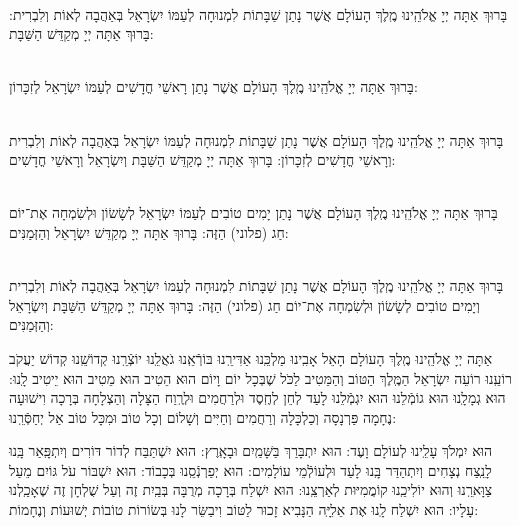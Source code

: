 \documentclass[twoside, openany, parskip=half, 11pt]{book}
\begin{document}
\begin{sometimes}

\\
בָּרוּךְ אַתָּה יְיָ אֱלֹהֵֽינוּ מֶֽלֶךְ הָעוֹלָם אֲשֶׁר נָתַן שַׁבָּתוֹת לִמְנוּחָה לְעַמּוֹ יִשְׂרָאֵל בְּאַהֲבָה 
לְאוֹת וְלִבְרִית: בָּרוּךְ אַתָּה יְיָ מְקַדֵּשׁ הַשַּׁבָּת:


\\
בָּרוּךְ אַתָּה יְיָ אֱלֹהֵֽינוּ מֶֽלֶךְ הָעוֹלָם 
אֲשֶׁר נָתַן רָאשֵׁי חֳדָשִׁים לְעַמּוֹ יִשְׂרָאֵל לְזִכָּרוֹן:


\\
בָּרוּךְ אַתָּה יְיָ אֱלֹהֵֽינוּ מֶֽלֶךְ הָעוֹלָם 
אֲשֶׁר נָתַן שַׁבָּתוֹת לִמְנוּחָה לְעַמּוֹ יִשְׂרָאֵל בְּאַהֲבָה לְאוֹת וְלִבְרִית וְרָאשֵׁי חֳדָשִׁים לְזִכָּרוֹן: 
בָּרוּךְ אַתָּה יְיָ מְקַדֵּשׁ הַשַּׁבָּת וְיִשְׂרָאֵל וְרָאשֵׁי חֳדָשִׁים:

\\
בָּרוּךְ אַתָּה יְיָ אֱלֹהֵֽינוּ מֶֽלֶךְ הָעוֹלָם 
אֲשֶׁר נָתַן יָמִים טוֹבִים לְעַמּוֹ יִשְׂרָאֵל 
לְשָׂשׂוֹן וּלְשִׂמְחָה אֶת־יוֹם חַג (פלוני) הַזֶּה: 
בָּרוּךְ אַתָּה יְיָ מְקַדֵּשׁ יִשְׂרָאֵל וְהַזְּמַנִּים:

\\
בָּרוּךְ אַתָּה יְיָ אֱלֹהֵֽינוּ מֶֽלֶךְ הָעוֹלָם אֲשֶׁר נָתַן שַׁבָּתוֹת לִמְנוּחָה לְעַמּוֹ יִשְׂרָאֵל בְּאַהֲבָה לְאוֹת וְלִבְרִית 
וְיָמִים טוֹבִים לְשָׂשׂוֹן וּלְשִׂמְחָה אֶת־יוֹם חַג (פלוני) הַזֶּה: 
בָּרוּךְ אַתָּה יְיָ מְקַדֵּשׁ הַשַּׁבָּת וְיִשְׂרָאֵל וְהַזְּמַנִּים:

\end{sometimes}


 אַתָּה יְיָ אֱלֹהֵֽינוּ מֶֽלֶךְ הָעוֹלָם הָאֵל אָבִֽינוּ מַלְכֵּֽנוּ אַדִּירֵֽנוּ בּוֹרְֿאֵֽנוּ גֹאֲלֵֽנוּ יוֹצְֿרֵֽנוּ קְדוֹשֵֽׁנוּ קְדוֹשׁ יַעֲקֹב רוֹעֵֽנוּ רוֹעֵה יִשְׂרָאֵל הַמֶּֽלֶךְ הַטּוֹב וְהַמֵּטִיב לַכֹּל שֶׁבְּכָל יוֹם וָיוֹם הוּא הֵטִיב הוּא מֵטִיב הוּא יֵיטִיב לָֽנוּ: הוּא גְמָלָֽנוּ הוּא גוֹמְֿלֵנוּ הוּא יִגְמְֿלֵנוּ לָעַד לְחֵן לְחֶֽסֶד וּלְרַחֲמִים וּלְרֶֽוַח הַצָּלָה וְהַצְלָחָה בְּרָכָה וִישׁוּעָה נֶחָמָה פַּרְנָסָה וְכַלְכָּלָה וְרַחֲמִים וְחַיִּים וְשָׁלוֹם וְכָל טוֹב וּמִכָּל טוֹב אַל יְחַסְּֿרֵֽנוּ: 



 הוּא יִמְלֹךְ עָלֵֽינוּ לְעוֹלָם וָעֶד: 
	 הוּא יִתְבָּרַךְ בַּשָּׁמַֽיִם וּבָאָֽרֶץ: 
	 הוּא יִשְׁתַּבַּח לְדוֹר דּוֹרִים וְיִתְפָּֽאַר בָּֽנוּ לָנֵֽצַח נְצָחִים 
		 וְיִתְהַדַּר בָּֽנוּ לָעַד וּלְעוֹלְֿמֵי עוֹלָמִים: 
	 הוּא יְפַרְנְֿסֵֽנוּ בְּכָבוֹד: 
	 הוּא יִשְׁבּוֹר עֹל גּוֹיִם מֵעַל צַוָּארֵֽנוּ וְהוּא יוֹלִיכֵֽנוּ קוֹמֲמִיּוּת לְאַרְצֵֽנוּ: 
	 הוּא יִשְׁלַח בְּרָכָה מְרֻבָּה בְּבַֽיִת זֶה וְעַל שֻׁלְחָן זֶה שֶׁאָכַֽלְנוּ עָלָיו: 
 הוּא יִשְׁלַח לָֽנוּ אֶת אֵלִיָּֽה הַנָּבִיא זָכוּר לַטּוֹב וִיבַשֵּׂר לָנוּ בְּשׂוֹרוֹת טוֹבוֹת יְשׁוּעוֹת וְנֶחָמוֹת:
\end{document}
